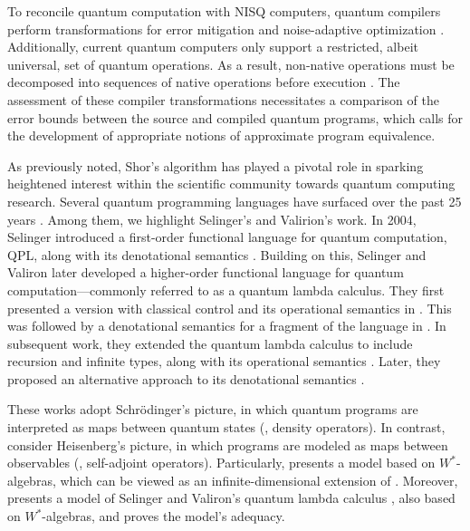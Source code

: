 To reconcile quantum computation with NISQ computers, quantum compilers perform transformations for error mitigation \cite{wallman2016noise} and noise-adaptive optimization \cite{murali2019noise}. Additionally, current quantum computers only support a restricted, albeit universal, set of quantum operations. As a result, non-native operations must be decomposed into sequences of native operations before execution \cite{harrow2002efficient,burgholzer2020advanced}. The assessment of these compiler transformations necessitates a comparison of the error bounds between the source and compiled quantum programs, which calls for the development of appropriate notions of approximate program equivalence.



As previously noted, Shor's algorithm has played a pivotal role in sparking heightened interest within the scientific community towards quantum computing research. Several quantum programming languages have surfaced over the past 25 years \cite{zhao2020quantum,serrano2022quantum}. Among them, we highlight Selinger's and Valirion's work. In 2004, Selinger introduced a first-order functional language for quantum computation, QPL, along with its denotational semantics \cite{selinger2004towards}. Building on this, Selinger and Valiron later developed a higher-order functional language for quantum computation—commonly referred to as a quantum lambda calculus. They first presented a version with classical control and its operational semantics in \cite{selinger2006lambda}. This was followed by a denotational semantics for a fragment of the language in \cite{selinger2008fully}. In subsequent work, they extended the quantum lambda calculus to include recursion and infinite types, along with its operational semantics \cite{selinger2009quantum}. Later, they proposed an alternative approach to its denotational semantics \cite{selinger2014}.


These works adopt Schr\"odinger's picture, in which quantum programs are interpreted as maps between quantum states (\ie, density operators). In contrast, \cite{choSemanticsQuantumProgramming2016, choNeumannAlgebrasForm2016} consider Heisenberg's picture, in which programs are modeled as maps between observables (\ie, self-adjoint operators). Particularly, \cite{choSemanticsQuantumProgramming2016} presents a model based on $W^*$-algebras, which can be viewed as an infinite-dimensional extension of \cite{selinger2004towards}. Moreover, \cite{choSemanticsQuantumProgramming2016} presents a model of Selinger and Valiron’s quantum lambda calculus \cite{selinger2006lambda, selinger2008linear, selinger2009quantum}, also based on $W^*$-algebras, and proves the model's adequacy.


